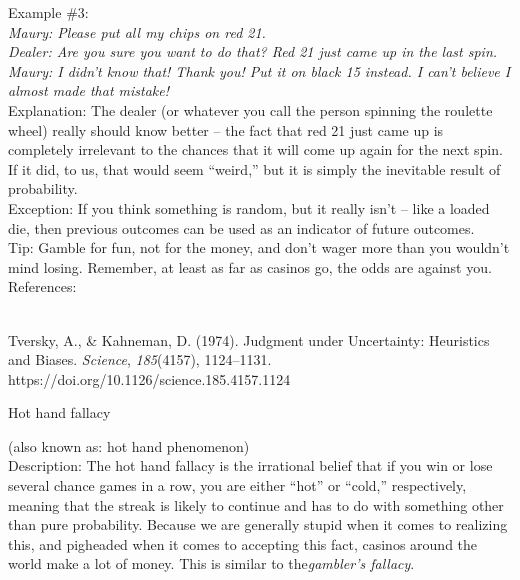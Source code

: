 \documentclass[a4paper,12pt,single,pdftex]{scrartcl}
\begin{document}
{    
      Example \#3:
    \\

    
      {\em Maury: Please put all my chips on red 21.}
    \\

    
      {\em Dealer: Are you sure you want to do that?  Red 21 just came up in the last spin.}
    \\

    
      {\em Maury:  I didn’t know that!  Thank you!  Put it on black 15 instead.  I can’t believe I almost made that mistake!}
    \\

    
      Explanation: The dealer (or whatever you call the person spinning the roulette wheel) really should know better -- the fact that red 21 just came up is completely irrelevant to the chances that it will come up again for the next spin.  If it did, to us, that would seem “weird,” but it is simply the inevitable result of probability.
    \\

    
      Exception: If you think something is random, but it really isn’t -- like a loaded die, then previous outcomes can be used as an indicator of future outcomes.
    \\

    
      Tip: Gamble for fun, not for the money, and don’t wager more than you wouldn’t mind losing.  Remember, at least as far as casinos go, the odds are against you.
    \\

    References:

    
      
        
      \\

      
        
          Tversky, A., \& Kahneman, D. (1974). Judgment under Uncertainty: Heuristics and Biases. {\it Science}, {\it 185}(4157), 1124–1131. https://doi.org/10.1126/science.185.4157.1124
        
      
    
  }


Hot hand fallacy
    
      (also known as: hot hand phenomenon)
    \\

  
    
      Description: The hot hand fallacy is the irrational belief that if you win or lose several chance games in a row, you are either “hot” or “cold,” respectively, meaning that the streak is likely to continue and has to do with something other than pure probability.  Because we are generally stupid when it comes to realizing this, and pigheaded when it comes to accepting this fact, casinos around the world make a lot of money. This is similar to the{\it  gambler’s fallacy}.
    \\
\end{document}
